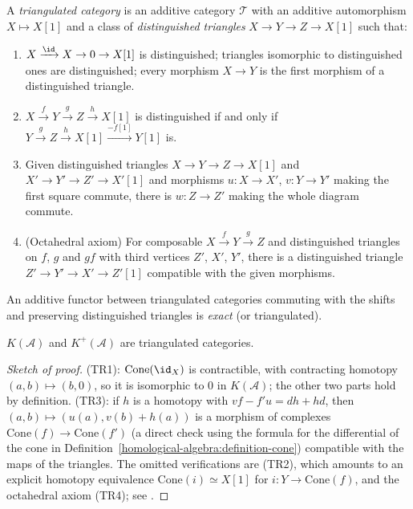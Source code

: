 \begin{definition}\label{homological-algebra:definition-triangulated}
A \emph{triangulated category} is an additive category $\mathcal{T}$ with an additive automorphism $X \mapsto X[1]$ and a class of
\emph{distinguished triangles} $X \to Y \to Z \to X[1]$ such that:
\begin{enumerate}
\item[(TR1)] $X \xrightarrow{\id} X \to 0 \to X[1]$ is distinguished; triangles isomorphic to distinguished ones are distinguished;
every morphism $X \to Y$ is the first morphism of a distinguished triangle.
\item[(TR2)] $X \xrightarrow{f} Y \xrightarrow{g} Z \xrightarrow{h} X[1]$ is distinguished if and only if
$Y \xrightarrow{g} Z \xrightarrow{h} X[1] \xrightarrow{-f[1]} Y[1]$ is.
\item[(TR3)] Given distinguished triangles $X \to Y \to Z \to X[1]$ and $X' \to Y' \to Z' \to X'[1]$ and morphisms $u \colon X \to X'$,
$v \colon Y \to Y'$ making the first square commute, there is $w \colon Z \to Z'$ making the whole diagram commute.
\item[(TR4)] (Octahedral axiom) For composable $X \xrightarrow{f} Y \xrightarrow{g} Z$ and distinguished triangles on $f$, $g$ and $gf$ with
third vertices $Z'$, $X'$, $Y'$, there is a distinguished triangle $Z' \to Y' \to X' \to Z'[1]$ compatible with the given
morphisms.
\end{enumerate}
An additive functor between triangulated categories commuting with the shifts and preserving distinguished triangles is
\emph{exact} (or triangulated).
\end{definition}

\begin{theorem}\label{homological-algebra:theorem-homotopy-triangulated}
$K(\mathcal{A})$ and $K^+(\mathcal{A})$ are triangulated categories.
\end{theorem}

\begin{proof}[Sketch of proof]
(TR1): $\mathrm{Cone}(\id_X)$ is contractible, with contracting homotopy $(a, b) \mapsto (b, 0)$, so it is isomorphic to $0$ in
$K(\mathcal{A})$; the other two parts hold by definition. (TR3): if $h$ is a homotopy with $vf - f'u = dh + hd$, then
$(a, b) \mapsto (u(a), v(b) + h(a))$ is a morphism of complexes $\mathrm{Cone}(f) \to \mathrm{Cone}(f')$ (a direct check using the formula for
the differential of the cone in Definition~\ref{homological-algebra:definition-cone}) compatible with the maps of the triangles. The
omitted verifications are (TR2), which amounts to an explicit homotopy equivalence $\mathrm{Cone}(i) \simeq X[1]$ for
$i \colon Y \to \mathrm{Cone}(f)$, and the octahedral axiom (TR4); see \cite[Sections 10.1--10.2]{weibel-homological}.
\end{proof}

